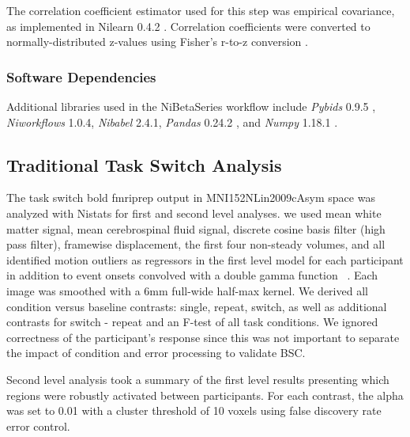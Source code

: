 \documentclass[10pt,letterpaper]{article}
\begin{document}
The correlation coefficient estimator used for this
step was empirical covariance, as implemented in Nilearn 0.4.2
\cite{Abraham2014}. Correlation coefficients were converted to
normally-distributed z-values using Fisher's r-to-z conversion
\cite{Fisher1915}.

\hypertarget{software-dependencies}{%
\subsubsection{Software Dependencies}\label{software-dependencies}}

Additional libraries used in the NiBetaSeries workflow include
\emph{Pybids} 0.9.5 \cite{Yarkoni2019}, \emph{Niworkflows} 1.0.4,
\emph{Nibabel} 2.4.1, \emph{Pandas} 0.24.2 \cite{McKinney2010}, and
\emph{Numpy} 1.18.1 \cite{VanDerWalt2011, Oliphant2006}.

\subsection*{Traditional Task Switch Analysis}
The task switch bold fmriprep output in MNI152NLin2009cAsym space
was analyzed with Nistats for first and second level analyses.
we used mean white matter signal, mean cerebrospinal fluid signal,
discrete cosine basis filter (high pass filter), framewise displacement, the first four non-steady volumes, and
all identified motion outliers as regressors in the first level model for each participant
in addition to event onsets convolved with a double gamma function ~\cite{Glover1999}.
Each image was smoothed with a 6mm full-wide half-max kernel.
We derived all condition versus baseline contrasts: single, repeat, switch, as well as
additional contrasts for switch - repeat and an F-test of all task conditions.
We ignored correctness of the participant's response since this was not important to
separate the impact of condition and error processing to validate BSC.

Second level analysis took a summary of the first level results presenting which
regions were robustly activated between participants.
For each contrast, the alpha was set to 0.01 with a cluster threshold of 10 voxels using
false discovery rate error control.
\end{document}
